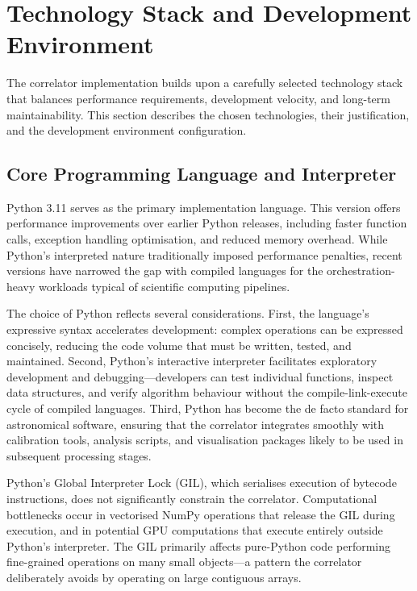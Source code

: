 \section{Technology Stack and Development Environment}

The correlator implementation builds upon a carefully selected technology stack that balances performance requirements, development velocity, and long-term maintainability. This section describes the chosen technologies, their justification, and the development environment configuration.

\subsection{Core Programming Language and Interpreter}

Python 3.11 serves as the primary implementation language. This version offers performance improvements over earlier Python releases, including faster function calls, exception handling optimisation, and reduced memory overhead. While Python's interpreted nature traditionally imposed performance penalties, recent versions have narrowed the gap with compiled languages for the orchestration-heavy workloads typical of scientific computing pipelines.

The choice of Python reflects several considerations. First, the language's expressive syntax accelerates development: complex operations can be expressed concisely, reducing the code volume that must be written, tested, and maintained. Second, Python's interactive interpreter facilitates exploratory development and debugging—developers can test individual functions, inspect data structures, and verify algorithm behaviour without the compile-link-execute cycle of compiled languages. Third, Python has become the de facto standard for astronomical software, ensuring that the correlator integrates smoothly with calibration tools, analysis scripts, and visualisation packages likely to be used in subsequent processing stages.

Python's Global Interpreter Lock (GIL), which serialises execution of bytecode instructions, does not significantly constrain the correlator. Computational bottlenecks occur in vectorised NumPy operations that release the GIL during execution, and in potential GPU computations that execute entirely outside Python's interpreter. The GIL primarily affects pure-Python code performing fine-grained operations on many small objects—a pattern the correlator deliberately avoids by operating on large contiguous arrays.


